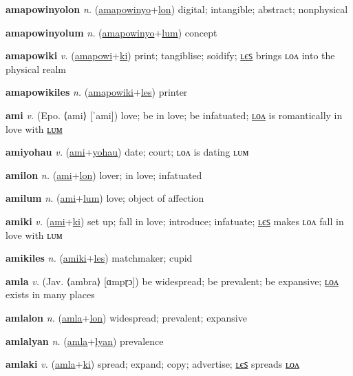 \textbf{\hypertarget{amapowinyolon}{amapowinyolon}} \textit{n.} (\hyperlink{amapowinyo}{amapowinyo}+\allowbreak \hyperlink{lon}{lon})
digital; intangible; abstract; nonphysical

\textbf{\hypertarget{amapowinyolum}{amapowinyolum}} \textit{n.} (\hyperlink{amapowinyo}{amapowinyo}+\allowbreak \hyperlink{lum}{lum})
concept

\textbf{\hypertarget{amapowiki}{amapowiki}} \textit{v.} (\hyperlink{amapowi}{amapowi}+\allowbreak \hyperlink{ki}{ki})
print; tangiblise; soidify; \hyperlink{amapowikiles}{ʟєꜱ} brings ʟᴏᴧ into the physical realm

\textbf{\hypertarget{amapowikiles}{amapowikiles}} \textit{n.} (\hyperlink{amapowiki}{amapowiki}+\allowbreak \hyperlink{les}{les})
printer

\textbf{\hypertarget{ami}{ami}} \textit{v.} (Epo. ⟨ami⟩ [ˈami])
love; be in love; be infatuated; \hyperlink{amilon}{ʟᴏᴧ} is romantically in love with \hyperlink{amilum}{ʟᴜᴍ}

\textbf{\hypertarget{amiyohau}{amiyohau}} \textit{v.} (\hyperlink{ami}{ami}+\allowbreak \hyperlink{yohau}{yohau})
date; court; ʟᴏᴧ is dating ʟᴜᴍ

\textbf{\hypertarget{amilon}{amilon}} \textit{n.} (\hyperlink{ami}{ami}+\allowbreak \hyperlink{lon}{lon})
lover; in love; infatuated

\textbf{\hypertarget{amilum}{amilum}} \textit{n.} (\hyperlink{ami}{ami}+\allowbreak \hyperlink{lum}{lum})
love; object of affection

\textbf{\hypertarget{amiki}{amiki}} \textit{v.} (\hyperlink{ami}{ami}+\allowbreak \hyperlink{ki}{ki})
set up; fall in love; introduce; infatuate; \hyperlink{amikiles}{ʟєꜱ} makes ʟᴏᴧ fall in love with ʟᴜᴍ

\textbf{\hypertarget{amikiles}{amikiles}} \textit{n.} (\hyperlink{amiki}{amiki}+\allowbreak \hyperlink{les}{les})
matchmaker; cupid

\textbf{\hypertarget{amla}{amla}} \textit{v.} (Jav. ⟨ambra⟩ [ɑmpɽɔ])
be widespread; be prevalent; be expansive; \hyperlink{amlalon}{ʟᴏᴧ} exists in many places

\textbf{\hypertarget{amlalon}{amlalon}} \textit{n.} (\hyperlink{amla}{amla}+\allowbreak \hyperlink{lon}{lon})
widespread; prevalent; expansive

\textbf{\hypertarget{amlalyan}{amlalyan}} \textit{n.} (\hyperlink{amla}{amla}+\allowbreak \hyperlink{lyan}{lyan})
prevalence

\textbf{\hypertarget{amlaki}{amlaki}} \textit{v.} (\hyperlink{amla}{amla}+\allowbreak \hyperlink{ki}{ki})
spread; expand; copy; advertise; \hyperlink{amlakiles}{ʟєꜱ} spreads \hyperlink{amlakilon}{ʟᴏᴧ}

